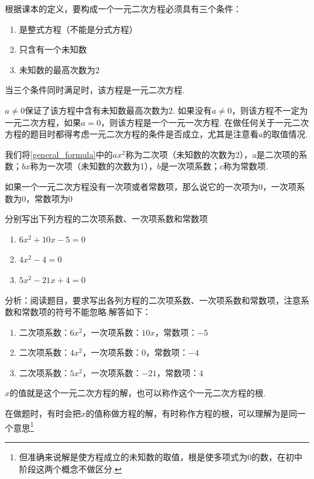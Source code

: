 \documentclass[lang=cn, 10pt, titlestyle=display, oneside, toc=twocol]{elegantbook}
\begin{document}
根据课本的定义，要构成一个一元二次方程必须具有三个条件：
\begin{enumerate}
    \item 是整式方程（不能是分式方程）
    \item 只含有一个未知数
    \item 未知数的最高次数为2
\end{enumerate}
\par
当三个条件同时满足时，该方程是一元二次方程.\\
\begin{remark}
    \(a\ne 0\)保证了该方程中含有未知数最高次数为2. 如果没有\(a\ne 0\)，则该方程不一定为一元二次方程，如果\(a= 0\)，则该方程是一个一元一次方程. 在做任何关于一元二次方程的题目时都得考虑一元二次方程的条件是否成立，尤其是注意看\(a\)的取值情况.
\end{remark}
\par
我们将\eqref{general_formula}中的$ax^2$称为二次项（未知数的次数为2），a是二次项的系数；$bx$称为一次项（未知数的次数为1），$b$是一次项系数；$c$称为常数项.
\par
\begin{remark}
    如果一个一元二次方程没有一次项或者常数项，那么说它的一次项为0，一次项系数为0，常数项为0
\end{remark}
\begin{example}
    分别写出下列方程的二次项系数、一次项系数和常数项
    \begin{enumerate}
        \item \( 6x^2+10x-5=0 \)
        \item \( 4x^2-4=0 \)
        \item \( 5x^2-21x+4=0 \)
    \end{enumerate}
\end{example}
\par
\begin{solution}
    分析：阅读题目，要求写出各列方程的二次项系数、一次项系数和常数项，注意系数和常数项的符号不能忽略.解答如下：
    \begin{enumerate}
        \item  二次项系数：\(6x^2\)，一次项系数：\(10x\)，常数项：\(-5\)
        \item  二次项系数：\(4x^2\)，一次项系数：\(0\)，常数项：\(-4\)
        \item  二次项系数：\(5x^2\)，一次项系数：\(-21\)，常数项：\(4\)
    \end{enumerate}
\end{solution}
$x$的值就是这个一元二次方程的解，也可以称作这个一元二次方程的根.
\begin{remark}
    在做题时，有时会把$x$的值称做方程的解，有时称作方程的根，可以理解为是同一个意思\footnote{但准确来说解是使方程成立的未知数的取值，根是使多项式为0的数，在初中阶段这两个概念不做区分.}
\end{remark}
\end{document}
